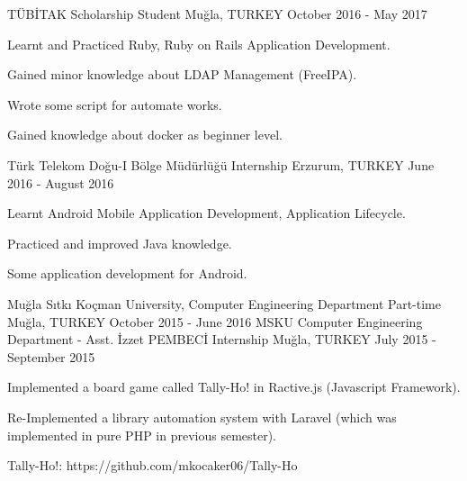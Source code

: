 \begin{cventries}
	\cventry
		{TÜBİTAK}
		{Scholarship Student}
		{Muğla, TURKEY}
		{October 2016 - May 2017}
		{
			\begin{cvitems}
				\item {Learnt and Practiced Ruby, Ruby on Rails Application Development.}
				\item {Gained minor knowledge about LDAP Management (FreeIPA).}
				\item {Wrote some script for automate works.}
				\item {Gained knowledge about docker as beginner level.}
			\end{cvitems}
		}
	\cventry
		{Türk Telekom Doğu-I Bölge Müdürlüğü}
		{Internship}
		{Erzurum, TURKEY}
		{June 2016 - August 2016}
		{
			\begin{cvitems}
				\item {Learnt Android Mobile Application Development, Application Lifecycle.}
				\item {Practiced and improved Java knowledge.}
				\item {Some application development for Android.}
			\end{cvitems}
		}
	\cventry
		{Muğla Sıtkı Koçman University, Computer Engineering Department}
		{Part-time}
		{Muğla, TURKEY}
		{October 2015 - June 2016}
		{}
	\cventry
		{MSKU Computer Engineering Department - Asst. İzzet PEMBECİ}
		{Internship}
		{Muğla, TURKEY}
		{July 2015 - September 2015}
		{
		  \begin{cvitems}
			\item {Implemented a board game called Tally-Ho! in Ractive.js (Javascript Framework).}
			\item {Re-Implemented a library automation system with Laravel (which was implemented in pure PHP in previous semester).}
			\item {Tally-Ho!: https://github.com/mkocaker06/Tally-Ho}
		  \end{cvitems}
		}

\end{cventries}
